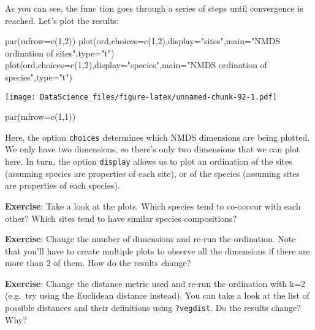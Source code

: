 \documentclass[
]{book}
\newenvironment{Shaded}{\begin{snugshade}}{\end{snugshade}}
\newcommand{\AttributeTok}[1]{\textcolor[rgb]{0.77,0.63,0.00}{#1}}
\newcommand{\DecValTok}[1]{\textcolor[rgb]{0.00,0.00,0.81}{#1}}
\newcommand{\FunctionTok}[1]{\textcolor[rgb]{0.00,0.00,0.00}{#1}}
\newcommand{\NormalTok}[1]{#1}
\newcommand{\StringTok}[1]{\textcolor[rgb]{0.31,0.60,0.02}{#1}}
\begin{document}
As you can see, the func tion goes through a series of steps until convergence is reached. Let's plot the results:

\begin{Shaded}
\begin{Highlighting}[]
\FunctionTok{par}\NormalTok{(}\AttributeTok{mfrow=}\FunctionTok{c}\NormalTok{(}\DecValTok{1}\NormalTok{,}\DecValTok{2}\NormalTok{))}
\FunctionTok{plot}\NormalTok{(ord,}\AttributeTok{choices=}\FunctionTok{c}\NormalTok{(}\DecValTok{1}\NormalTok{,}\DecValTok{2}\NormalTok{),}\AttributeTok{display=}\StringTok{"sites"}\NormalTok{,}\AttributeTok{main=}\StringTok{"NMDS ordination of sites"}\NormalTok{,}\AttributeTok{type=}\StringTok{"t"}\NormalTok{)}
\FunctionTok{plot}\NormalTok{(ord,}\AttributeTok{choices=}\FunctionTok{c}\NormalTok{(}\DecValTok{1}\NormalTok{,}\DecValTok{2}\NormalTok{),}\AttributeTok{display=}\StringTok{"species"}\NormalTok{,}\AttributeTok{main=}\StringTok{"NMDS ordination of species"}\NormalTok{,}\AttributeTok{type=}\StringTok{"t"}\NormalTok{)}
\end{Highlighting}
\end{Shaded}

\texttt{[image: DataScience\_files/figure-latex/unnamed-chunk-92-1.pdf]}

\begin{Shaded}
\begin{Highlighting}[]
\FunctionTok{par}\NormalTok{(}\AttributeTok{mfrow=}\FunctionTok{c}\NormalTok{(}\DecValTok{1}\NormalTok{,}\DecValTok{1}\NormalTok{))}
\end{Highlighting}
\end{Shaded}

Here, the option \texttt{choices} determines which NMDS dimensions are being plotted. We only have two dimensions, so there's only two dimensions that we can plot here. In turn, the option \texttt{display} allows us to plot an ordination of the sites (assuming species are properties of each site), or of the species (assuming sites are properties of each species).

\textbf{Exercise}: Take a look at the plots. Which species tend to co-occcur with each other? Which sites tend to have similar species compositions?

\textbf{Exercise}: Change the number of dimensions and re-run the ordination. Note that you'll have to create multiple plots to observe all the dimensions if there are more than 2 of them. How do the results change?

\textbf{Exercise}: Change the distance metric used and re-run the ordination with k=2 (e.g.~try using the Euclidean distance instead). You can take a look at the list of possible distances and their definitions using \texttt{?vegdist}. Do the results change? Why?
\end{document}
